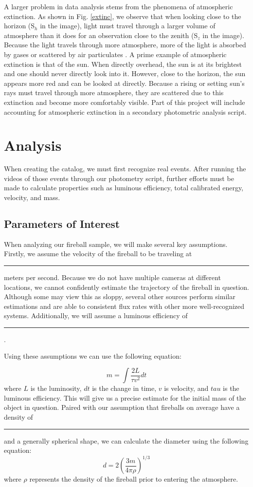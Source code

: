 A larger problem in data analysis stems from the phenomena of atmospheric extinction.
As shown in Fig. \ref{extinc}, we observe that when looking close to the horizon (S$_h$ in the image), light must travel through a larger volume of atmosphere than it does for an observation close to the zenith (S$_z$ in the image).  
Because the light travels through more atmosphere, more of the light is absorbed by gases or scattered by air particulates \cite{noauthor_atmospheric_nodate}.
A prime example of atmospheric extinction is that of the sun. 
When directly overhead, the sun is at its brightest and one should never directly look into it.
However, close to the horizon, the sun appears more red and can be looked at directly.
Because a rising or setting sun's rays must travel through more atmosphere, they are scattered due to this extinction and become more comfortably visible.
Part of this project will include accounting for atmospheric extinction in a secondary photometric analysis script.

\section{Analysis}

When creating the catalog, we must first recognize real events.  
After running the videos of those events through our photometry script, further efforts must be made to calculate properties such as luminous efficiency, total calibrated energy, velocity, and mass.




\subsection{Parameters of Interest}

When analyzing our fireball sample, we will make several key assumptions.  
Firstly, we assume the velocity of the fireball to be traveling at \rule{1cm}{.1pt} meters per second.
Because we do not have multiple cameras at different locations, we cannot confidently estimate the trajectory of the fireball in question.
Although some may view this as sloppy, several other sources perform similar estimations and are able to consistent flux rates with other more well-recognized systems.
Additionally, we will assume a luminous efficiency of \rule{1cm}{.1pt}.

Using these assumptions we can use the following equation:

\begin{equation}
m = \int \frac{2L}{\tau v^2} dt
\end{equation}
where $L$ is the luminosity, $dt$ is the change in time, $v$ is velocity, and $tau$ is the luminous efficiency.
This will give us a precise estimate for the initial mass of the object in question.
Paired with our assumption that fireballs on average have a density of \rule{1cm}{.1pt} and a generally spherical shape, we can calculate the diameter using the following equation:
\begin{equation}
d = 2(\frac{3m}{4\pi \rho})^{1/3}
\end{equation}
where $\rho$ represents the density of the fireball prior to entering the atmosphere.

